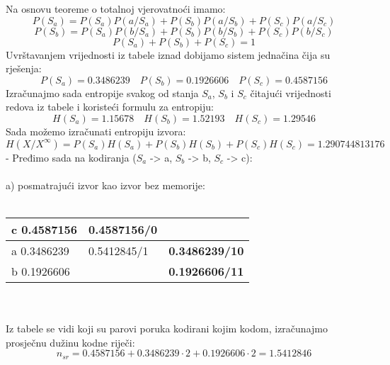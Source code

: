 \documentclass[12pt]{article}
\begin{document}
\begin{enumerate}
Na osnovu teoreme o totalnoj vjerovatnoći imamo: \\
\begin{equation*}
    P(S_a) = P(S_a)P(a/S_a) + P(S_b)P(a/S_b) + P(S_c)P(a/S_c)
\end{equation*} 
\begin{equation*}
    P(S_b) = P(S_a)P(b/S_a) + P(S_b)P(b/S_b) + P(S_c)P(b/S_c)
\end{equation*} 
\begin{equation*}
    P(S_a) + P(S_b) + P(S_c) = 1
\end{equation*}
Uvrštavanjem vrijednosti iz tabele iznad dobijamo sistem jednačina čija
su rješenja:
\begin{equation*}
    P(S_a) = 0.3486239 \quad P(S_b) = 0.1926606 \quad P(S_c) = 0.4587156
\end{equation*}
Izračunajmo sada entropije svakog od stanja $S_a$, $S_b$ i $S_c$ čitajući vrijednosti
redova iz tabele i koristeći formulu za entropiju:
\begin{equation*}
    H(S_a) = 1.15678 \quad H(S_b) = 1.52193 \quad H(S_c) = 1.29546
\end{equation*}
Sada možemo izračunati entropiju izvora:
\begin{equation*}
    H(X/X^\infty) = P(S_a)H(S_a) + P(S_b)H(S_b) + P(S_c)H(S_c) = 1.290744813176
\end{equation*}
- Pređimo sada na kodiranja ($S_a$ -> a, $S_b$ -> b, $S_c$ -> c): \\
\\
a) posmatrajući izvor kao izvor bez memorije:
\\
\\
\begin{tabular}{|l|l|l}
\cline{1-2}
c 0.4587156 & \textbf{0.4587156/0} &                                            \\ \hline
a 0.3486239 & 0.5412845/1          & \multicolumn{1}{l|}{\textbf{0.3486239/10}} \\ \cline{1-1} \cline{3-3} 
b 0.1926606 &                      & \multicolumn{1}{l|}{\textbf{0.1926606/11}} \\ \hline
\end{tabular}
\\
\\
Iz tabele se vidi koji su parovi poruka kodirani kojim kodom, izračunajmo
prosječnu dužinu kodne riječi:
\begin{equation*}
    n_{sr} = 0.4587156 + 0.3486239 \cdot 2 + 0.1926606 \cdot 2 = 1.5412846
\end{equation*}

\end{enumerate}
\end{document}
